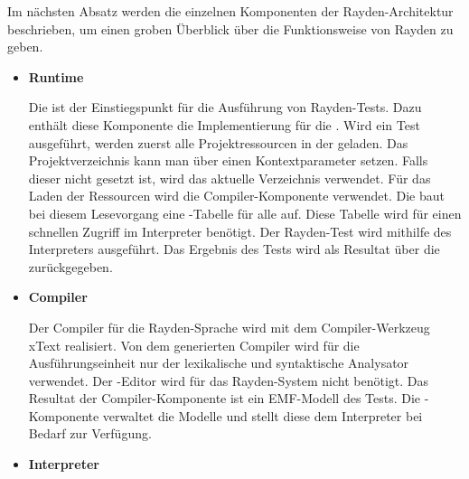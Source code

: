 \SuperPar
Im nächsten Absatz werden die einzelnen Komponenten der Rayden-Architektur beschrieben, um einen groben Überblick über die Funktionsweise von Rayden zu geben.\\

\begin{itemize}

\item \textbf{Runtime}

Die  ist der Einstiegspunkt für die Ausführung von Rayden-Tests. Dazu enthält diese Komponente die Implementierung für die . Wird ein Test ausgeführt, werden zuerst alle Projektressourcen in der  geladen. Das Projektverzeichnis kann man über einen Kontextparameter setzen. Falls dieser nicht gesetzt ist, wird das aktuelle Verzeichnis verwendet. Für das Laden der Ressourcen wird die Compiler-Komponente verwendet. Die  baut bei diesem Lesevorgang eine -Tabelle für alle  auf. Diese Tabelle wird für einen schnellen Zugriff im Interpreter benötigt. Der Rayden-Test wird mithilfe des Interpreters ausgeführt. Das Ergebnis des Tests wird als Resultat über die  zurückgegeben.\\

\item \textbf{Compiler}

Der Compiler für die Rayden-Sprache wird mit dem Compiler-Werkzeug xText \cite{xtext} realisiert. Von dem generierten Compiler wird für die Ausführungseinheit nur der lexikalische und syntaktische Analysator verwendet. Der -Editor wird für das Rayden-System nicht benötigt. Das Resultat der Compiler-Komponente ist ein EMF-Modell des Tests. Die -Komponente verwaltet die Modelle und stellt diese dem Interpreter bei Bedarf zur Verfügung.\\

\item \textbf{Interpreter}


\end{itemize}
